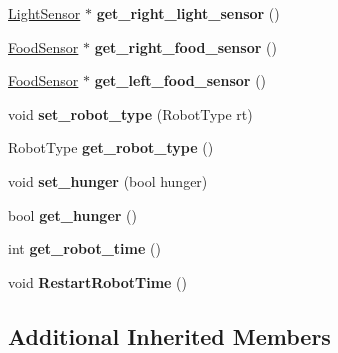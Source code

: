 \begin{DoxyCompactItemize}
\item 
\hyperlink{classLightSensor}{Light\+Sensor} $\ast$ {\bfseries get\+\_\+right\+\_\+light\+\_\+sensor} ()\hypertarget{classRobot_aff66784b080f5d7329a8f45d679d1b60}{}\label{classRobot_aff66784b080f5d7329a8f45d679d1b60}

\item 
\hyperlink{classFoodSensor}{Food\+Sensor} $\ast$ {\bfseries get\+\_\+right\+\_\+food\+\_\+sensor} ()\hypertarget{classRobot_acdf59a9f9124f4d8a910a2fa85e4d7c3}{}\label{classRobot_acdf59a9f9124f4d8a910a2fa85e4d7c3}

\item 
\hyperlink{classFoodSensor}{Food\+Sensor} $\ast$ {\bfseries get\+\_\+left\+\_\+food\+\_\+sensor} ()\hypertarget{classRobot_a6bde50502517a623c309dbfbef546063}{}\label{classRobot_a6bde50502517a623c309dbfbef546063}

\item 
void {\bfseries set\+\_\+robot\+\_\+type} (Robot\+Type rt)\hypertarget{classRobot_ad811b955d24c95ebb16f0a2c185876a9}{}\label{classRobot_ad811b955d24c95ebb16f0a2c185876a9}

\item 
Robot\+Type {\bfseries get\+\_\+robot\+\_\+type} ()\hypertarget{classRobot_a1463b5699ff9a30a76768f7570b43b0d}{}\label{classRobot_a1463b5699ff9a30a76768f7570b43b0d}

\item 
void {\bfseries set\+\_\+hunger} (bool hunger)\hypertarget{classRobot_a3acf3a0f65d23859d7991667b09d28ef}{}\label{classRobot_a3acf3a0f65d23859d7991667b09d28ef}

\item 
bool {\bfseries get\+\_\+hunger} ()\hypertarget{classRobot_aacdc924197b130a93046168cc31933a8}{}\label{classRobot_aacdc924197b130a93046168cc31933a8}

\item 
int {\bfseries get\+\_\+robot\+\_\+time} ()\hypertarget{classRobot_ae8f5051655c730486561e43be5602ca7}{}\label{classRobot_ae8f5051655c730486561e43be5602ca7}

\item 
void {\bfseries Restart\+Robot\+Time} ()\hypertarget{classRobot_a80dc608c5bf63c6d3b814a9f36fde462}{}\label{classRobot_a80dc608c5bf63c6d3b814a9f36fde462}

\end{DoxyCompactItemize}
\subsection*{Additional Inherited Members}


